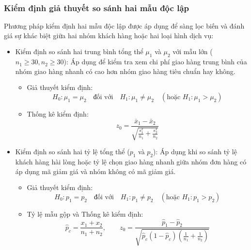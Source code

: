 	\subsubsection{Kiểm định giả thuyết so sánh hai mẫu độc lập}
	
	Phương pháp kiểm định hai mẫu độc lập được áp dụng để sàng lọc biến và đánh giá sự khác biệt giữa hai nhóm khách hàng hoặc hai loại hình dịch vụ:
	
	\begin{itemize}
		\item Kiểm định so sánh hai trung bình tổng thể $\mu_1$ và $\mu_2$ với mẫu lớn ($n_1 \ge 30, n_2 \ge 30$):
		Áp dụng để kiểm tra xem chi phí giao hàng trung bình của nhóm giao hàng nhanh có cao hơn nhóm giao hàng tiêu chuẩn hay không.
		\begin{itemize}[label={$+$}, leftmargin=*]
			\item Giả thuyết kiểm định:
			\begin{equation*}
				H_0: \mu_1 = \mu_2 \quad \text{đối với} \quad H_1: \mu_1 \neq \mu_2 \quad (\text{hoặc } H_1: \mu_1 > \mu_2)
			\end{equation*}
			\item Thống kê kiểm định:
			\begin{equation}
				z_0 = \frac{\bar{x}_1 - \bar{x}_2}{\sqrt{\frac{s_1^2}{n_1} + \frac{s_2^2}{n_2}}}
			\end{equation}
		\end{itemize}
		
		\item Kiểm định so sánh hai tỷ lệ tổng thể ($p_1$ và $p_2$):
		Áp dụng khi so sánh tỷ lệ khách hàng hài lòng hoặc tỷ lệ chọn giao hàng nhanh giữa nhóm đơn hàng có áp dụng mã giảm giá và nhóm không có mã giảm giá.
		\begin{itemize}[label={$+$}, leftmargin=*]
			\item Giả thuyết kiểm định:
			\begin{equation*}
				H_0: p_1 = p_2 \quad \text{đối với} \quad H_1: p_1 \neq p_2 \quad (\text{hoặc } H_1: p_1 > p_2)
			\end{equation*}
			\item Tỷ lệ mẫu gộp và Thống kê kiểm định:
			\begin{equation}
				\hat{p}_c = \frac{x_1 + x_2}{n_1 + n_2}, \qquad z_0 = \frac{\hat{p}_1 - \hat{p}_2}{\sqrt{\hat{p}_c(1 - \hat{p}_c)\left(\frac{1}{n_1} + \frac{1}{n_2}\right)}}
			\end{equation}
		\end{itemize}
		

\end{itemize}
